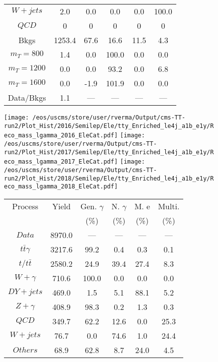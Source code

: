 \begin{figure}
\begin{minipage}[c]{0.32\textwidth}
{\begin{tabular}{cccccc}
$ W+jets $ &  2.0 &  0.0 &  0.0 &  0.0 &  100.0\\
$ QCD $ &  0 &  0 &  0 &  0 &  0\\
Bkgs &  1253.4 &  67.6 &  16.6 &  11.5 &  4.3\\
$ m_{T} = 800 $ &  1.4 &  0.0 &  100.0 &  0.0 &  0.0\\
$ m_{T} = 1200 $ &  0.0 &  0.0 &  93.2 &  0.0 &  6.8\\
$ m_{T} = 1600 $ &  0.0 &  -1.9 &  101.9 &  0.0 &  0.0\\
Data/Bkgs &  1.1 &  --- &  --- &  --- &  ---\\
\hline
\end{tabular}
}
\end{minipage}
\end{figure}

\begin{figure}
\centering
\texttt{[image: /eos/uscms/store/user/rverma/Output/cms-TT-run2/Plot\_Hist/2016/Semilep/Ele/tty\_Enriched\_le4j\_a1b\_e1y/Reco\_mass\_lgamma\_2016\_EleCat.pdf]}
\texttt{[image: /eos/uscms/store/user/rverma/Output/cms-TT-run2/Plot\_Hist/2017/Semilep/Ele/tty\_Enriched\_le4j\_a1b\_e1y/Reco\_mass\_lgamma\_2017\_EleCat.pdf]}
\texttt{[image: /eos/uscms/store/user/rverma/Output/cms-TT-run2/Plot\_Hist/2018/Semilep/Ele/tty\_Enriched\_le4j\_a1b\_e1y/Reco\_mass\_lgamma\_2018\_EleCat.pdf]}
\begin{minipage}[c]{0.32\textwidth}
\centering
\tiny{
\begin{tabular}{cccccc}
\hline
Process & Yield & Gen. $\gamma$ & N. $\gamma$ & M. e & Multi. \\
 &  & (\%) & (\%) & (\%) & (\%)  \\
\hline
                                                                      $ Data $ &  8970.0 &  --- &  --- &  --- &  ---\\
$ t\bar{t}\gamma $ &  3217.6 &  99.2 &  0.4 &  0.3 &  0.1\\
$ t/t\bar{t} $ &  2580.2 &  24.9 &  39.4 &  27.4 &  8.3\\
$ W+\gamma $ &  710.6 &  100.0 &  0.0 &  0.0 &  0.0\\
$ DY+jets $ &  469.0 &  1.5 &  5.1 &  88.1 &  5.2\\
$ Z+\gamma $ &  408.9 &  98.3 &  0.2 &  1.3 &  0.3\\
$ QCD $ &  349.7 &  62.2 &  12.6 &  0.0 &  25.3\\
$ W+jets $ &  76.7 &  0.0 &  74.6 &  1.0 &  24.4\\
$ Others $ &  68.9 &  62.8 &  8.7 &  24.0 &  4.5\\

\end{tabular}}
\end{minipage}
\end{figure}
